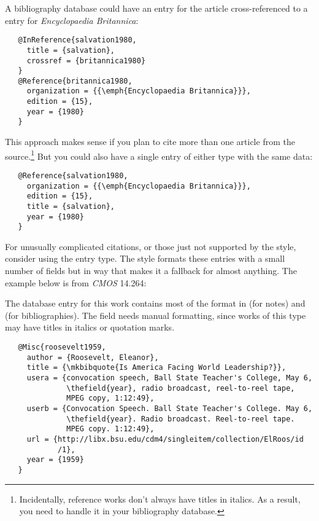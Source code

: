 \documentclass[11pt,letterpaper,oneside]{article}
\begin{document}
A bibliography database could have an  entry for
the article cross-ref\-er\-enc\-ed to a  entry for
\textit{Encyclopaedia Britannica}:

\begin{verbatim}
   @InReference{salvation1980,
     title = {salvation},
     crossref = {britannica1980}
   }
   @Reference{britannica1980,
     organization = {{\emph{Encyclopaedia Britannica}}},
     edition = {15},
     year = {1980}
   }
\end{verbatim}

\noindent This approach makes sense if you plan to cite more than one
article from the source.\footnote{Incidentally, reference works don't
always have titles in italics. As a result, you need to handle it in
your bibliography database.} But you could also have a single entry of
either type with the same data:

\begin{verbatim}
   @Reference{salvation1980,
     organization = {{\emph{Encyclopaedia Britannica}}},
     edition = {15},
     title = {salvation},
     year = {1980}
   }
\end{verbatim}

For unusually complicated citations, or those just not supported by
the style, consider using the  entry type. The style
formats these entries with a small number of fields but in way that
makes it a fallback for almost anything. The example below is from
\textit{CMOS} 14.264:

\begin{citebib}
\item \cite{roosevelt1959}
\end{citebib}

\noindent The database entry for this work contains most of the format
in  (for notes) and  (for
bibliographies). The  field needs manual formatting,
since works of this type may have titles in italics or quotation
marks.

\begin{verbatim}
   @Misc{roosevelt1959,
     author = {Roosevelt, Eleanor},
     title = {\mkbibquote{Is America Facing World Leadership?}},
     usera = {convocation speech, Ball State Teacher's College, May 6,
              \thefield{year}, radio broadcast, reel-to-reel tape,
              MPEG copy, 1:12:49},
     userb = {Convocation Speech. Ball State Teacher's College. May 6,
              \thefield{year}. Radio broadcast. Reel-to-reel tape.
              MPEG copy. 1:12:49},
     url = {http://libx.bsu.edu/cdm4/singleitem/collection/ElRoos/id
            /1},
     year = {1959}
   }
\end{verbatim}
\end{document}
